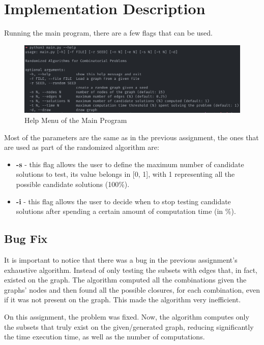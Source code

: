 \documentclass[...]{revdetua}
\begin{document}
\section{Implementation Description}

Running the main program, there are a few flags that
can be used.

\begin{figure}[!htb]
    \centering
    \includegraphics[width=1\columnwidth]{./figures/program_help}
    \caption{Help Menu of the Main Program}
    \label{fig: Help Menu}
\end{figure}

Most of the parameters are the same as in the previous assignment, the ones that are used as part of the randomized algorithm are:
\begin{itemize}
    \item \textbf{-s} - this flag allows the user to define the maximum number of candidate solutions to test, its value belongs in [0, 1], with 1 representing all the possible candidate solutions (100\%).
    \item \textbf{-i} - this flag allows the user to decide  when  to  stop  testing candidate solutions after spending a certain amount of computation time (in \%).
\end{itemize}

\subsection{Bug Fix}

It is important to notice that there was a bug in the previous assignment's exhaustive algorithm. Instead of only testing the subsets with edges that, in fact, existed on the graph. The algorithm computed all the combinations given the graphs' nodes and then found all the possible closures, for each combination, even if it was not present on the graph. This made the algorithm very inefficient.

On this assignment, the problem was fixed. Now, the algorithm computes only the subsets that truly exist on the given/generated graph, reducing significantly the time execution time, as well as the number of computations.
\end{document}
